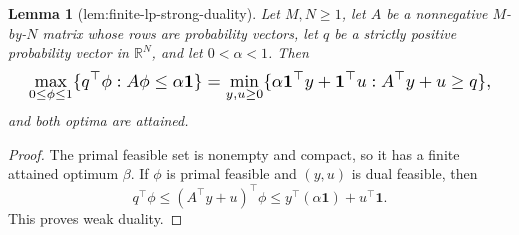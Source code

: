 \documentclass{article}
\newtheorem{lemma}{Lemma}
\begin{document}
\begin{lemma}[lem:finite-lp-strong-duality]\label{lem:finite-lp-strong-duality}
Let \(M,N\geq1\), let \(A\) be a nonnegative \(M\)-by-\(N\) matrix whose rows are probability vectors, let \(q\) be a strictly positive probability vector in \(\mathbb R^N\), and let \(0<\alpha<1\). Then
\[
\makebox[\linewidth][c]{\resizebox{0.98\linewidth}{!}{\par\noindent \makebox[\linewidth][c]{\resizebox{0.98\linewidth}{!}{\(\displaystyle \displaystyle \max_{0\leq\phi\leq1}\{q^\top\phi:A\phi\leq\alpha\mathbf1\}=\min_{y,u\geq0}\{\alpha\mathbf1^\top y+\mathbf1^\top u:A^\top y+u\geq q\},\)}}\par\noindent}}
\]
and both optima are attained.
\end{lemma}
\begin{proof}
The primal feasible set is nonempty and compact, so it has a finite attained optimum \(\beta\). If \(\phi\) is primal feasible and \((y,u)\) is dual feasible, then
\[
 q^\top\phi\leq(A^\top y+u)^\top\phi\leq y^\top(\alpha\mathbf1)+u^\top\mathbf1.\tag{1}
\]
This proves weak duality.


\end{proof}
\end{document}
